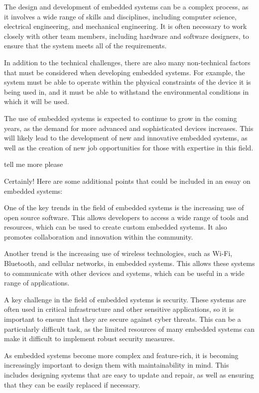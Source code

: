     The design and development of embedded systems can be a complex process, as it involves a wide range of skills and disciplines, including computer science, electrical engineering, and mechanical engineering. It is often necessary to work closely with other team members, including hardware and software designers, to ensure that the system meets all of the requirements.

    In addition to the technical challenges, there are also many non-technical factors that must be considered when developing embedded systems. For example, the system must be able to operate within the physical constraints of the device it is being used in, and it must be able to withstand the environmental conditions in which it will be used.

    The use of embedded systems is expected to continue to grow in the coming years, as the demand for more advanced and sophisticated devices increases. This will likely lead to the development of new and innovative embedded systems, as well as the creation of new job opportunities for those with expertise in this field.

tell me more please

Certainly! Here are some additional points that could be included in an essay on embedded systems:

    One of the key trends in the field of embedded systems is the increasing use of open source software. This allows developers to access a wide range of tools and resources, which can be used to create custom embedded systems. It also promotes collaboration and innovation within the community.

    Another trend is the increasing use of wireless technologies, such as Wi-Fi, Bluetooth, and cellular networks, in embedded systems. This allows these systems to communicate with other devices and systems, which can be useful in a wide range of applications.

    A key challenge in the field of embedded systems is security. These systems are often used in critical infrastructure and other sensitive applications, so it is important to ensure that they are secure against cyber threats. This can be a particularly difficult task, as the limited resources of many embedded systems can make it difficult to implement robust security measures.

    As embedded systems become more complex and feature-rich, it is becoming increasingly important to design them with maintainability in mind. This includes designing systems that are easy to update and repair, as well as ensuring that they can be easily replaced if necessary.

